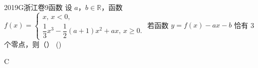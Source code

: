 
\begin{problem}{2019}{G}{浙江卷}{9}{函数}
设 $ a $，$ b\in\mathbb{R} $，函数 $ f(x)=\begin{cases}
x,\,x<0,\\
\dfrac{1}{3}x^{3}-\dfrac{1}{2}(a+1)x^{2}+ax,\,x\geq0.
\end{cases} $ 若函数 $ y=f(x)-ax-b $ 恰有 3 个零点，则（\hspace{1cm}） (\hspace{1cm})
\begin{choices}
\end{choices}
\end{problem}

\begin{answer}
C
\end{answer}

